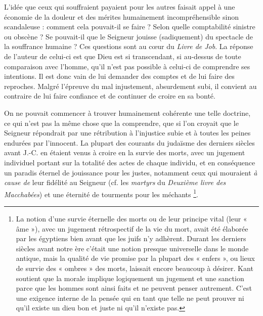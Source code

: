  L'idée que ceux qui souffraient payaient pour les autres faisait appel à une économie de la douleur et des mérites humainement incompréhensible sinon scandaleuse : comment cela pouvait-il se faire ? Selon quelle comptabilité sinistre ou obscène ? Se pouvait-il que le Seigneur jouisse (sadiquement) du spectacle de la souffrance humaine ? Ces questions sont au cœur du \emph{Livre de Job}. La réponse de l'auteur de celui-ci est que Dieu est si transcendant, si au-dessus de toute comparaison avec l'homme, qu'il n'est pas possible à celui-ci de comprendre ses intentions. Il est donc vain de lui demander des comptes et de lui faire des reproches. Malgré l'épreuve du mal injustement, absurdement subi, il convient au contraire de lui faire confiance et de continuer de croire en sa bonté. 

 On ne pouvait commencer à trouver humainement cohérente une telle doctrine, ce qui n'est pas la même chose que la comprendre, que si l'on croyait que le Seigneur répondrait par une rétribution  à l'injustice subie et à toutes les peines endurées par l'innocent. La plupart des courants du judaïsme des derniers siècles avant J.-C. en étaient venus à croire en la survie des morts, avec un jugement individuel portant sur la totalité des actes de chaque individu, et en conséquence un paradis éternel de jouissance pour les justes, notamment ceux qui mouraient \emph{à cause de} leur fidélité au Seigneur (cf. les \emph{martyrs} du \emph{Deuxième livre des Macchabées}) et une éternité de tourments pour les méchants%
\footnote{La notion d'une survie éternelle des morts ou de leur principe vital (leur « âme »), avec un jugement rétrospectif de la vie du mort, avait été élaborée par les égyptiens bien avant que les juifs n'y adhèrent. Durant les derniers siècles avant notre ère c'était une notion presque universelle dans le monde antique, mais la qualité de vie promise par la plupart des « enfers », ou lieux de survie des « ombres » des morts, laissait encore beaucoup à désirer. Kant soutient que la morale implique logiquement un jugement et une sanction  parce que les hommes sont ainsi faits et ne peuvent penser autrement. C'est une exigence interne de la pensée qui en tant que telle ne peut prouver ni qu'il existe un dieu bon et juste  ni qu'il n'existe pas.}.

